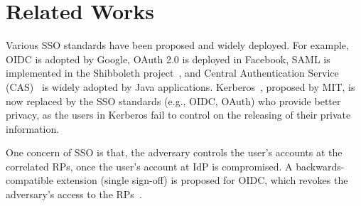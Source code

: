 \section{Related Works}%
\label{sec:related}
Various SSO  standards have been proposed and widely deployed. For example, OIDC is adopted by Google, OAuth 2.0 is deployed in Facebook, SAML is implemented in the Shibboleth project~\cite{Shibboleth}, and Central Authentication Service (CAS)~\cite{aubry2004esup} is widely adopted by Java applications.
Kerberos~\cite{Kerberos}, proposed by MIT, is now replaced by the SSO standards (e.g., OIDC, OAuth) who provide better privacy, as the users in Kerberos fail to control on the releasing of their private information.

One concern of SSO is that, the adversary  controls the user's accounts at the correlated RPs, once the user's account at IdP is compromised. A backwards-compatible extension (single sign-off) is proposed for OIDC, which revokes the adversary's access to the RPs~\cite{GhasemisharifRC18}.

